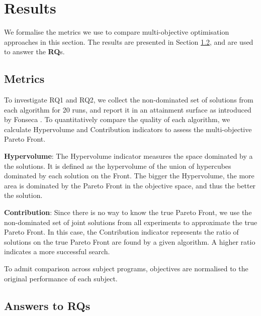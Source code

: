 
\section{Results}
\label{sec_results}


We formalise the metrics we use to compare multi-objective optimisation approaches in this section.
The results are presented in Section \ref{sec_answers}, and are used to answer the \textbf{RQ}s.

\subsection{Metrics}
\label{sec_matrics}

To investigate RQ1 and RQ2, we collect the non-dominated set of solutions from each algorithm for 20 runs, and report it in an attainment surface as introduced by Fonseca \cite{attainment_surface:1996}. To quantitatively compare the quality of each algorithm, we calculate Hypervolume and Contribution indicators to assess the multi-objective Pareto Front.

\textbf{Hypervolume}: The Hypervolume indicator \cite{797969} measures the space dominated by a the solutions. It is defined as the hypervolume of the union of hypercubes dominated by each solution on the Front. The bigger the Hypervolume, the more area is dominated by the Pareto Front in the objective space, and thus the better the solution.

\textbf{Contribution}: Since there is no way to know the true Pareto Front, we use the non-dominated set of joint solutions from all experiments to approximate the true Pareto Front. In this case, the Contribution indicator represents the ratio of solutions on the true Pareto Front are found by a given algorithm. A higher ratio indicates a more successful search. 

To admit comparison across subject programs, objectives are normalised to the original performance of each subject.

\subsection{Answers to RQs}
\label{sec_answers}

\newcommand{\shallow}{Sha}
\newcommand{\all}{All}
\newcommand{\randomsearch}{Rand}
\newcommand{\nsgaii}{NSGA}
\newcommand{\sr}{\emph{\shallow\randomsearch}}
\newcommand{\sn}{\emph{\shallow\nsgaii}}
\newcommand{\dr}{\emph{\all\randomsearch}}
\newcommand{\dn}{\emph{\all\nsgaii}}

